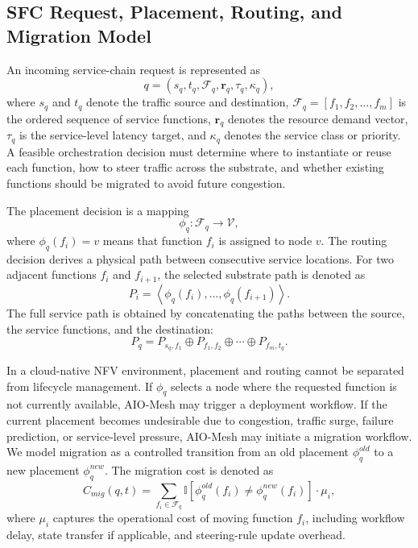 \documentclass[final,5p]{elsarticle}
\begin{document}
\subsection{SFC Request, Placement, Routing, and Migration Model}
\label{subsec:sfc_model}

An incoming service-chain request is represented as
\begin{equation}
    q = \left(s_q, t_q, \mathcal{F}_q, \mathbf{r}_q, \tau_q, \kappa_q\right),
\end{equation}
where \(s_q\) and \(t_q\) denote the traffic source and destination, \(\mathcal{F}_q = [f_1, f_2, \ldots, f_m]\) is the ordered sequence of service functions, \(\mathbf{r}_q\) denotes the resource demand vector, \(\tau_q\) is the service-level latency target, and \(\kappa_q\) denotes the service class or priority. A feasible orchestration decision must determine where to instantiate or reuse each function, how to steer traffic across the substrate, and whether existing functions should be migrated to avoid future congestion.

The placement decision is a mapping
\begin{equation}
    \phi_q: \mathcal{F}_q \rightarrow \mathcal{V},
\end{equation}
where \(\phi_q(f_i)=v\) means that function \(f_i\) is assigned to node \(v\). The routing decision derives a physical path between consecutive service locations. For two adjacent functions \(f_i\) and \(f_{i+1}\), the selected substrate path is denoted as
\begin{equation}
    P_i = \left\langle \phi_q(f_i), \ldots, \phi_q(f_{i+1}) \right\rangle.
\end{equation}
The full service path is obtained by concatenating the paths between the source, the service functions, and the destination:
\begin{equation}
    P_q = P_{s_q,f_1} \oplus P_{f_1,f_2} \oplus \cdots \oplus P_{f_m,t_q}.
\end{equation}

In a cloud-native NFV environment, placement and routing cannot be separated from lifecycle management. If \(\phi_q\) selects a node where the requested function is not currently available, AIO-Mesh may trigger a deployment workflow. If the current placement becomes undesirable due to congestion, traffic surge, failure prediction, or service-level pressure, AIO-Mesh may initiate a migration workflow. We model migration as a controlled transition from an old placement \(\phi_q^{old}\) to a new placement \(\phi_q^{new}\). The migration cost is denoted as
\begin{equation}
    C_{mig}(q,t) = \sum_{f_i \in \mathcal{F}_q} \mathbb{I}\left[\phi_q^{old}(f_i) \neq \phi_q^{new}(f_i)\right] \cdot \mu_i,
\end{equation}
where \(\mu_i\) captures the operational cost of moving function \(f_i\), including workflow delay, state transfer if applicable, and steering-rule update overhead.
\end{document}
